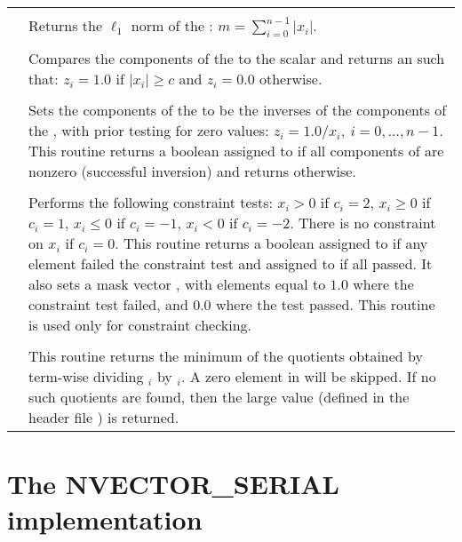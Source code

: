 \begin{xtabular}{|p{\colone}|p{\coltwo}|}
\\[2mm]
 &  \\
& Returns the $\ell_1$ norm of the  :
$m = \sum_{i=0}^{n-1} | x_i |$.
\\[2mm]
 &  \\
& Compares the components of the   to the 
scalar  and returns an   such that:
$z_i = 1.0$ if $| x_i | \ge c$ and $z_i = 0.0$ otherwise.
\\[2mm]
 &  \\
& Sets the components of the   to be the inverses
of the components of the  , with prior testing
for zero values:
$z_i = 1.0 /  x_i  , \: i=0,\ldots,n-1$.
This routine returns a boolean assigned to  if all 
components of  are
nonzero (successful inversion) and returns  otherwise.  
\\[2mm]
 &  \\
& Performs the following constraint tests:
$x_i > 0$ if $c_i=2$,
$x_i \ge 0$ if $c_i=1$,
$x_i \le 0$ if $c_i=-1$,
$x_i < 0$ if $c_i=-2$.
There is no constraint on $x_i$ if $c_i=0$.
This routine returns a boolean assigned to  if any element failed
the constraint test and assigned to  if all passed.  It also sets a
mask vector , with elements equal to $1.0$ where the constraint 
test failed, and $0.0$ where the test passed.
This routine is used only for constraint checking.
\\[2mm]
 &  \\
& This routine returns the minimum of the quotients obtained   
by term-wise dividing $_i$ by $_i$. 
A zero element in  will be skipped. 
If no such quotients are found, then the large value 
 (defined in the header file )
is returned. 
\\
\end{xtabular}
\bigskip

\section{The NVECTOR\_SERIAL implementation}\label{ss:nvec_ser}



